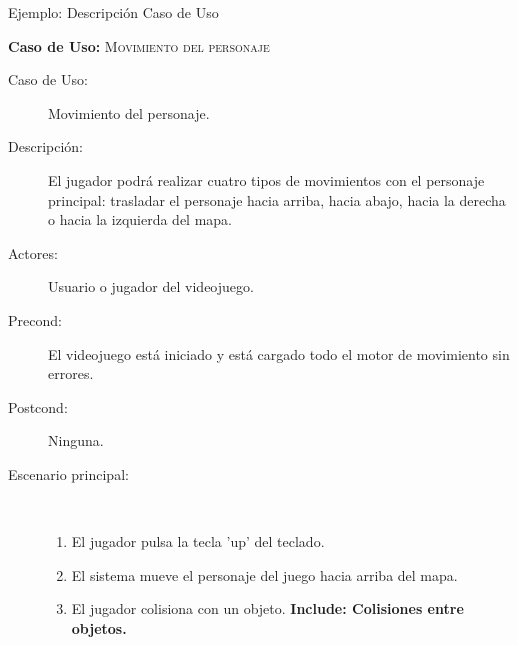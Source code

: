 \documentclass[9pt,xcolor=svgnames]{beamer}
\begin{document}
  
  
  \begin{frame}{Ejemplo: Descripción Caso de Uso}
   
   \textbf{Caso de Uso:} \textsc{Movimiento del personaje}
   
   \begin{description}
    \item[Caso de Uso:] Movimiento del personaje.
    \item[Descripción:] El jugador podrá realizar cuatro tipos de
	  movimientos con el personaje principal: trasladar el personaje
	  hacia arriba, hacia abajo, hacia la derecha o hacia la
	  izquierda del mapa.
    \item[Actores:] Usuario o jugador del videojuego.
    \item[Precond:] El videojuego está iniciado y está
	  cargado todo el motor de movimiento sin errores.
    \item[Postcond:] Ninguna.
    \item[Escenario principal:] $\quad$	  
	       \begin{enumerate}
		\item El jugador pulsa la tecla 'up' del teclado.
		\item El sistema mueve el personaje del juego hacia arriba
		      del mapa.
		\item El jugador colisiona con un objeto. \textbf{Include:
		      Colisiones entre objetos.}
	       \end{enumerate}
   \end{description}
  \end{frame}
  
\end{document}
